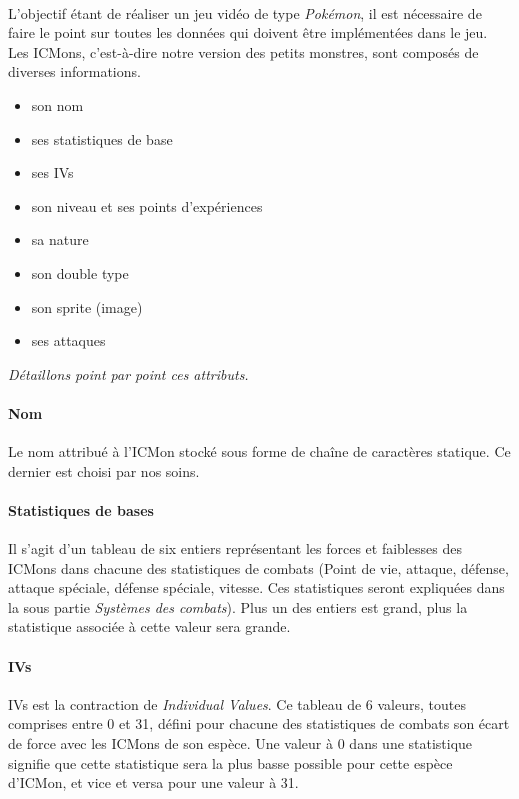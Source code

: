 \documentclass[12pt,a4paper, twoside]{article}
\begin{document}
        \paragraph{} L'objectif étant de réaliser un jeu vidéo de type \emph{Pokémon}, il est nécessaire de faire le point sur toutes les données qui doivent être implémentées dans le jeu.\\
        Les ICMons, c'est-à-dire notre version des petits monstres, sont composés de diverses informations. \\
        \begin{itemize}
            \item son nom
            \item ses statistiques de base
            \item ses IVs
            \item son niveau et ses points d'expériences
            \item sa nature
            \item son double type
            \item son sprite (image)
            \item ses attaques
        \end{itemize}
        \emph{Détaillons point par point ces attributs.}
        \paragraph{Nom} Le nom attribué à l'ICMon stocké sous forme de chaîne de caractères statique. Ce dernier est choisi par nos soins.
        \paragraph{Statistiques de bases} Il s'agit d'un tableau de six entiers représentant les forces et faiblesses des ICMons dans chacune des statistiques de combats (Point de vie, attaque, défense, attaque spéciale, défense spéciale, vitesse. Ces statistiques seront expliquées dans la sous partie \emph{Systèmes des combats}).
        Plus un des entiers est grand, plus la statistique associée à cette valeur sera grande.
        \paragraph{IVs} IVs est la contraction de \emph{Individual Values}. Ce tableau de 6 valeurs, toutes comprises entre 0 et 31, défini pour chacune des statistiques de combats son écart de force avec les ICMons de son espèce. Une valeur à 0 dans une statistique signifie que cette statistique sera la plus basse possible pour cette espèce d'ICMon, et vice et versa pour une valeur à 31.
\end{document}
